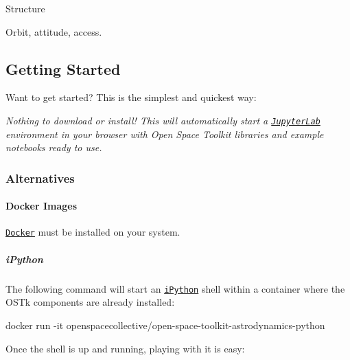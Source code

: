 Structure

\href{https://github.com/open-space-collective/open-space-toolkit-astrodynamics/actions/workflows/build-test.yml}{\tt } \href{https://codecov.io/gh/open-space-collective/open-space-toolkit-astrodynamics}{\tt } \href{https://open-space-collective.github.io/open-space-toolkit-astrodynamics}{\tt } \href{https://badge.fury.io/gh/open-space-collective%2Fopen-space-toolkit-astrodynamics}{\tt } \href{https://badge.fury.io/py/open-space-toolkit-astrodynamics}{\tt } \href{https://opensource.org/licenses/Apache-2.0}{\tt }

Orbit, attitude, access.



\subsection*{Getting Started}

Want to get started? This is the simplest and quickest way\+:

\href{https://mybinder.org/v2/gh/open-space-collective/open-space-toolkit/main?urlpath=lab/tree/notebooks}{\tt }

{\itshape Nothing to download or install! This will automatically start a \href{https://jupyterlab.readthedocs.io/en/stable/}{\tt Jupyter\+Lab} environment in your browser with Open Space Toolkit libraries and example notebooks ready to use.}

\subsubsection*{Alternatives}

\paragraph*{Docker Images}

\href{https://www.docker.com/}{\tt Docker} must be installed on your system.

\subparagraph*{i\+Python}

The following command will start an \href{https://ipython.org/}{\tt i\+Python} shell within a container where the O\+S\+Tk components are already installed\+:


\begin{DoxyCode}
docker run -it openspacecollective/open-space-toolkit-astrodynamics-python
\end{DoxyCode}


Once the shell is up and running, playing with it is easy\+:


